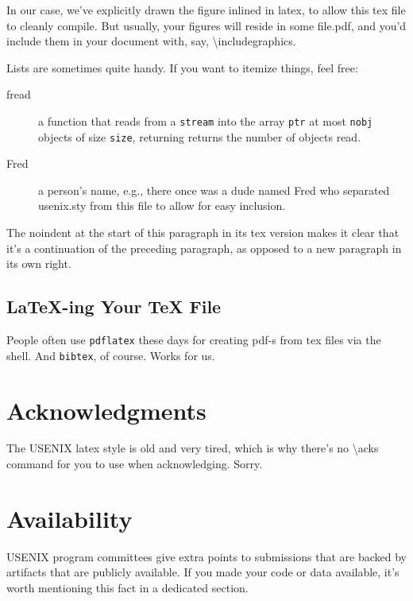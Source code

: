 \documentclass[letterpaper,twocolumn,10pt]{article}
\begin{document}
In our case, we've explicitly drawn the figure inlined in latex, to
allow this tex file to cleanly compile. But usually, your figures will
reside in some file.pdf, and you'd include them in your document
with, say, \textbackslash{}includegraphics.

Lists are sometimes quite handy. If you want to itemize things, feel
free:

\begin{description}
  
\item[fread] a function that reads from a \texttt{stream} into the
  array \texttt{ptr} at most \texttt{nobj} objects of size
  \texttt{size}, returning returns the number of objects read.

\item[Fred] a person's name, e.g., there once was a dude named Fred
  who separated usenix.sty from this file to allow for easy
  inclusion.
\end{description}

\noindent
The noindent at the start of this paragraph in its tex version makes
it clear that it's a continuation of the preceding paragraph, as
opposed to a new paragraph in its own right.


\subsection{LaTeX-ing Your TeX File}

People often use \texttt{pdflatex} these days for creating pdf-s from
tex files via the shell. And \texttt{bibtex}, of course. Works for us.

\section*{Acknowledgments}

The USENIX latex style is old and very tired, which is why
there's no \textbackslash{}acks command for you to use when
acknowledging. Sorry.

\section*{Availability}

USENIX program committees give extra points to submissions that are
backed by artifacts that are publicly available. If you made your code
or data available, it's worth mentioning this fact in a dedicated
section.



\end{document}
